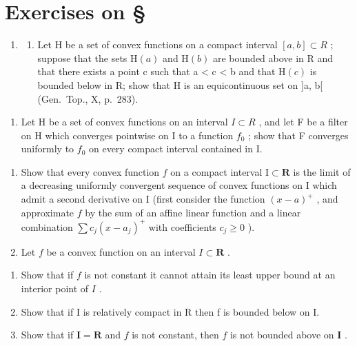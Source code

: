 \section*{Exercises on \S{}}
{}

\begin{enumerate}
\def\labelenumi{\arabic{enumi})}
\tightlist
\item
  \begin{enumerate}
  \def\labelenumii{\alph{enumii})}
  \tightlist
  \item
    Let H be a set of convex functions on a compact interval \([a, b] \subset R\) ; suppose that the sets \(\mathrm{H}(a)\) and \(\mathrm{H}(b)\) are bounded above in R and that there exists a point c such that a \textless{} c \textless{} b and that \(\mathrm{H}(c)\) is bounded below in R; show that H is an equicontinuous set on {]}a, b{[} (Gen.~Top., X, p.~283).
  \end{enumerate}
\end{enumerate}

\begin{enumerate}
\def\labelenumi{\alph{enumi})}
\setcounter{enumi}{1}
\tightlist
\item
  Let H be a set of convex functions on an interval \(I \subset R\) , and let F be a filter on H which converges pointwise on I to a function \(f_{0}\) ; show that F converges uniformly to \(f_{0}\) on every compact interval contained in I.
\end{enumerate}

\begin{enumerate}
\def\labelenumi{\arabic{enumi})}
\setcounter{enumi}{1}
\item
  Show that every convex function \(f\) on a compact interval \(\mathrm{I} \subset \mathbf{R}\) is the limit of a decreasing uniformly convergent sequence of convex functions on \(\mathrm{I}\) which admit a second derivative on \(\mathrm{I}\) (first consider the function \((x - a)^+\) , and approximate \(f\) by the sum of an affine linear function and a linear combination \(\sum c_j(x - a_j)^+\) with coefficients \(c_j \geqslant 0\) ).
\item
  Let \(f\) be a convex function on an interval \(I \subset \mathbf{R}\) .
\end{enumerate}

\begin{enumerate}
\def\labelenumi{\alph{enumi})}
\item
  Show that if \(f\) is not constant it cannot attain its least upper bound at an interior point of \(I\) .
\item
  Show that if I is relatively compact in R then f is bounded below on I.
\item
  Show that if \(\mathbf{I} = \mathbf{R}\) and \(f\) is not constant, then \(f\) is not bounded above on \(\mathbf{I}\) .
\end{enumerate}

